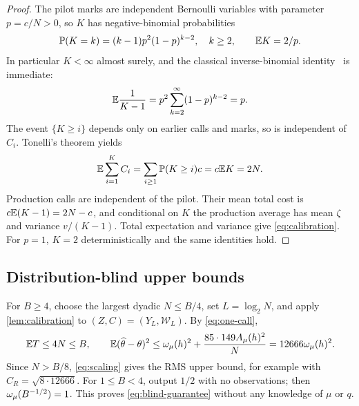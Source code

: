 \begin{proof}
The pilot marks are independent Bernoulli variables with parameter
$p=c/N>0$, so $K$ has negative-binomial probabilities
\[
 \mathbb P(K=k)=(k-1)p^2(1-p)^{k-2},\quad k\ge2,\qquad \mathbb E K=2/p.
\]
In particular $K<\infty$ almost surely, and the classical inverse-binomial
identity~\cite{haldane} is immediate:
\begin{equation}\label{eq:inverse-binomial}
 \mathbb E\frac1{K-1}=p^2\sum_{k=2}^\infty(1-p)^{k-2}=p.
\end{equation}
The event $\{K\ge i\}$ depends only on earlier calls and marks, so is
independent of $C_i$. Tonelli's theorem yields
\[
 \mathbb E\sum_{i=1}^K C_i=\sum_{i\ge1}\mathbb P(K\ge i)c=c\mathbb E K=2N.
\]
Production calls are independent of the pilot. Their mean total cost is
$c\mathbb E(K-1)=2N-c$, and conditional on $K$ the production average has mean
$\zeta$ and variance $v/(K-1)$. Total expectation and variance give
\eqref{eq:calibration}. For $p=1$, $K=2$ deterministically and the same
identities hold.
\end{proof}

\subsection{Distribution-blind upper bounds}
For $B\ge4$, choose the largest dyadic $N\le B/4$, set $L=\log_2N$,
and apply \cref{lem:calibration} to $(Z,C)=(Y_L,\mathcal W_L)$.
By \eqref{eq:one-call},
\begin{equation}\label{eq:blind-MSE}
 \mathbb E T\le4N\le B,\qquad
 \mathbb E(\widehat\theta-\theta)^2
 \le\omega_\mu(h)^2+\frac{85\cdot149A_\mu(h)^2}{N}
 =12666\omega_\mu(h)^2.
\end{equation}
Since $N>B/8$, \eqref{eq:scaling} gives the RMS upper bound, for example
with $C_R=\sqrt{8\cdot12666}$. For $1\le B<4$, output $1/2$ with no
observations; then $\omega_\mu(B^{-1/2})=1$. This proves
\eqref{eq:blind-guarantee} without any knowledge of $\mu$ or $q$.

